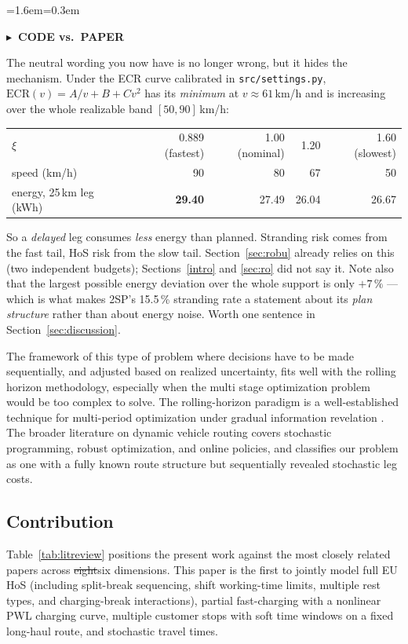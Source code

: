 \documentclass[preprint,12pt,3p]{elsarticle}
\newcommand{\FIX}[1]{{\color{annred}#1}}
\newcommand{\DEL}[1]{{\color{anngray}\sout{#1}}}
\newcommand{\prov}[1]{{\setlength{\fboxsep}{1pt}\colorbox{provyellow}{#1}}}
\newenvironment{ann}[2]{%
  \par\addvspace{4pt}%
  \begin{list}{}{\leftmargin=1.6em\rightmargin=0.3em\topsep=0pt\parsep=3pt\itemsep=0pt\listparindent=0pt}%
  \item[]\color{#1}\small\textbf{\textsf{#2}}\par\nopagebreak\vspace{1pt}\color{#1}\small\ignorespaces}
  {\end{list}\addvspace{4pt}}
\newenvironment{acode}{\begin{ann}{annorange}{$\blacktriangleright$\ CODE vs.\ PAPER}}{\end{ann}}
\begin{document}
\begin{acode}
The neutral wording you now have is no longer wrong, but it hides the mechanism.
Under the ECR curve calibrated in \texttt{src/settings.py},
$\mathrm{ECR}(v) = A/v + B + Cv^2$ has its \emph{minimum} at $v \approx 61$\,km/h
and is increasing over the whole realizable band $[50,90]$\,km/h:

\medskip
\begin{center}\footnotesize
\begin{tabular}{lrrrr}
\toprule
$\xi$ & 0.889 (fastest) & 1.00 (nominal) & 1.20 & 1.60 (slowest)\\
speed (km/h) & 90 & 80 & 67 & 50\\
energy, 25\,km leg (kWh) & \textbf{29.40} & 27.49 & 26.04 & 26.67\\
\bottomrule
\end{tabular}
\end{center}

\medskip
So a \emph{delayed} leg consumes \emph{less} energy than planned. Stranding risk
comes from the fast tail, HoS risk from the slow tail. Section~\ref{sec:robu}
already relies on this (two independent budgets); Sections~\ref{intro} and
\ref{sec:ro} did not say it. Note also that the largest possible energy deviation
over the whole support is only $+7\,\%$ --- which is what makes 2SP's
\prov{15.5\,\%} stranding rate a statement about its \emph{plan structure} rather
than about energy noise. Worth one sentence in Section~\ref{sec:discussion}.
\end{acode}

The framework of this type of problem where decisions have to be made sequentially, and adjusted based on realized uncertainty, fits well with the rolling horizon methodology, especially when the multi stage optimization problem would be too complex to solve. The rolling-horizon paradigm is a well-established technique for multi-period optimization under gradual information revelation \citep{glomb_rolling-horizon_2022}. The broader literature on dynamic vehicle routing \citep{pillac_review_2013} covers stochastic programming, robust optimization, and online policies, and classifies our problem as one with a fully known route structure but sequentially revealed stochastic leg costs.

\subsection{Contribution}

Table~\ref{tab:litreview} positions the present work against the most closely related papers across \DEL{eight}\FIX{six} dimensions. This paper is the first to jointly model full EU HoS (including split-break sequencing, shift working-time limits, multiple rest types, and charging-break interactions), partial fast-charging with a nonlinear PWL charging curve, multiple customer stops with soft time windows on a fixed long-haul route, and stochastic travel times.
\end{document}
